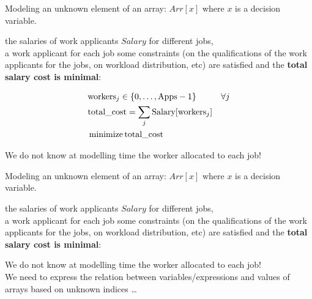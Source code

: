 \documentclass{cons-beamer}
\begin{document}
\begin{frame}{}
	Modeling an \textcolor{Melon}{unknown element of an array}: $Arr[x]$ where $x$ is a decision variable.
	\vfill
	
	\begin{example}
		 the salaries of work applicants $Salary$ for different jobs, \\
		 a work applicant
		for each job  some constraints (on the
		qualifications of the work applicants for the jobs, on workload
		distribution, etc) are satisfied and the \textbf{total salary cost is
			minimal}: 
		
		\begin{align*}
			&\text{workers}_j \in \{0, \dots, \text{Apps}-1\} &&\forall j \\
			&\text{total\_cost} = \sum_{j} \text{Salary}[\text{workers}_j]\\
			&\operatorname*{minimize} \text{total\_cost}
		\end{align*}
		
		\vfill
		\alert{We do not know at modelling time the worker allocated to each job!}
	\end{example}
\end{frame}

\begin{flashcardcpmpy}
	\begin{frame}{}
		Modeling an \textcolor{Melon}{unknown element of an array}: $Arr[x]$ where $x$ is a decision variable.
		\vfill
		
		\begin{example}
			 the salaries of work applicants $Salary$ for different jobs, \\
			 a work applicant
			for each job  some constraints (on the
			qualifications of the work applicants for the jobs, on workload
			distribution, etc) are satisfied and the \textbf{total salary cost is
				minimal}: 
			\vfill
			
			 \vfill
			\vfill
			
			\alert{We do not know at modelling time the worker allocated to each job!} \\ \vfill
			We need to express the relation between variables/expressions and values of arrays based on unknown indices \dots
		\end{example}
	\end{frame}
\end{flashcardcpmpy}
\end{document}
